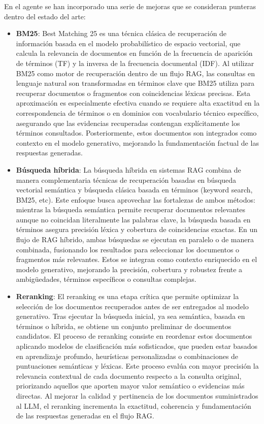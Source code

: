 En el agente se han incorporado una serie de mejoras que se consideran punteras dentro del estado del arte:

\begin{itemize}
    \item \textbf{BM25}: Best Matching 25 es una técnica clásica de recuperación de información basada en el modelo probabilístico de espacio vectorial, que calcula la relevancia de documentos en función de la frecuencia de aparición de términos (TF) y la inversa de la frecuencia documental (IDF). 
    Al utilizar BM25 como motor de recuperación dentro de un flujo RAG, las consultas en lenguaje natural son transformadas en términos clave que BM25 utiliza para recuperar documentos o fragmentos con coincidencias léxicas precisas. 
    Esta aproximación es especialmente efectiva cuando se requiere alta exactitud en la correspondencia de términos o en dominios con vocabulario técnico específico, asegurando que las evidencias recuperadas contengan explícitamente los términos consultados. 
    Posteriormente, estos documentos son integrados como contexto en el modelo generativo, mejorando la fundamentación factual de las respuestas generadas.
    \item \textbf{Búsqueda híbrida}: La búsqueda híbrida en sistemas RAG combina de manera complementaria técnicas de recuperación basadas en búsqueda vectorial semántica y búsqueda clásica basada en términos (keyword search, BM25, etc). 
    Este enfoque busca aprovechar las fortalezas de ambos métodos: mientras la búsqueda semántica permite recuperar documentos relevantes aunque no coincidan literalmente las palabras clave, la búsqueda basada en términos asegura precisión léxica y cobertura de coincidencias exactas. 
    En un flujo de RAG híbrido, ambas búsquedas se ejecutan en paralelo o de manera combinada, fusionando los resultados para seleccionar los documentos o fragmentos más relevantes. 
    Estos se integran como contexto enriquecido en el modelo generativo, mejorando la precisión, cobertura y robustez frente a ambigüedades, términos específicos o consultas complejas.

    \item \textbf{Reranking}: El reranking es una etapa crítica que permite optimizar la selección de los documentos recuperados antes de ser entregados al modelo generativo. 
    Tras ejecutar la búsqueda inicial, ya sea semántica, basada en términos o híbrida, se obtiene un conjunto preliminar de documentos candidatos. 
    El proceso de reranking consiste en reordenar estos documentos aplicando modelos de clasificación más sofisticados, que pueden estar basados en aprendizaje profundo, heurísticas personalizadas o combinaciones de puntuaciones semánticas y léxicas. 
    Este proceso evalúa con mayor precisión la relevancia contextual de cada documento respecto a la consulta original, priorizando aquellos que aporten mayor valor semántico o evidencias más directas. 
    Al mejorar la calidad y pertinencia de los documentos suministrados al LLM, el reranking incrementa la exactitud, coherencia y fundamentación de las respuestas generadas en el flujo RAG.
    

\end{itemize}
